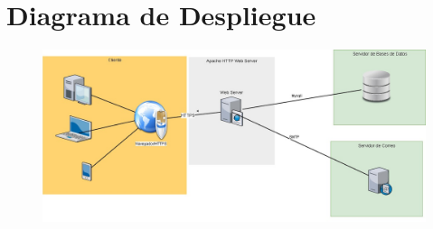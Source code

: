 \chapter{Diagrama de Despliegue}

\begin{figure}[h!]
\centering
\includegraphics[width=1\textwidth, angle=90, origin=c]{Img/Disenyo/DIAGRAMA_DESPLIEGUE.jpg}
\end{figure}